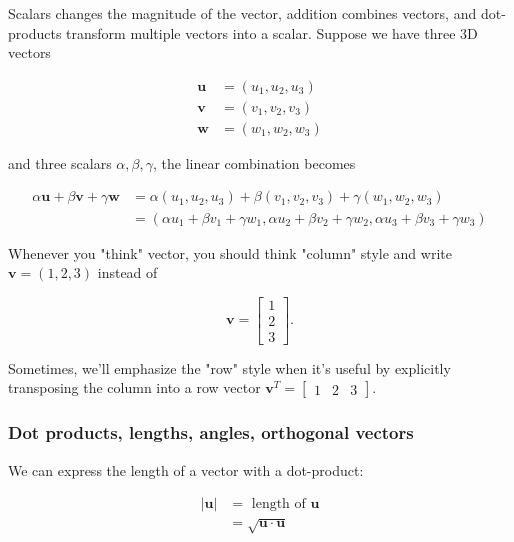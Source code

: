 \documentclass[main.tex]{subfiles}
\begin{document}
    Scalars changes the magnitude of the vector, addition combines vectors, and dot-products transform multiple vectors into a scalar. Suppose we have three 3D vectors 
    
    $$\begin{aligned} \mathbf{u} &=\left(u_{1}, u_{2}, u_{3}\right) \\ \mathbf{v} &=\left(v_{1}, v_{2}, v_{3}\right) \\ \mathbf{w} &=\left(w_{1}, w_{2}, w_{3}\right) \end{aligned}$$
    
    and three scalars $\alpha, \beta, \gamma$, the linear combination becomes
    
    $$\begin{aligned} \alpha \mathbf{u}+\beta \mathbf{v}+\gamma \mathbf{w} &=\alpha\left(u_{1}, u_{2}, u_{3}\right)+\beta\left(v_{1}, v_{2}, v_{3}\right)+\gamma\left(w_{1}, w_{2}, w_{3}\right) \\ &=\left(\alpha u_{1}+\beta v_{1}+\gamma w_{1}, \alpha u_{2}+\beta v_{2}+\gamma w_{2}, \alpha u_{3}+\beta v_{3}+\gamma w_{3}\right) \end{aligned}$$
    
    Whenever you "think" vector, you should think "column" style and write $\mathbf{v}=(1,2,3)$ instead of 
    
    $$\mathbf{v}=\left[\begin{array}{l}1 \\ 2 \\ 3\end{array}\right].$$
    
    Sometimes, we'll emphasize the "row" style when it's useful by explicitly transposing the column into a row vector $\mathbf{v}^{T}=\left[\begin{array}{lll}1 & 2 & 3\end{array}\right]$.
    
    \subsubsection{Dot products, lengths, angles, orthogonal vectors}
    
    We can express the length of a vector with a dot-product:
    
    $$\begin{aligned}|\mathbf{u}| &=\text { length of } \mathbf{u} \\ &=\sqrt{\mathbf{u} \cdot \mathbf{u}} \end{aligned}$$
    
\end{document}
